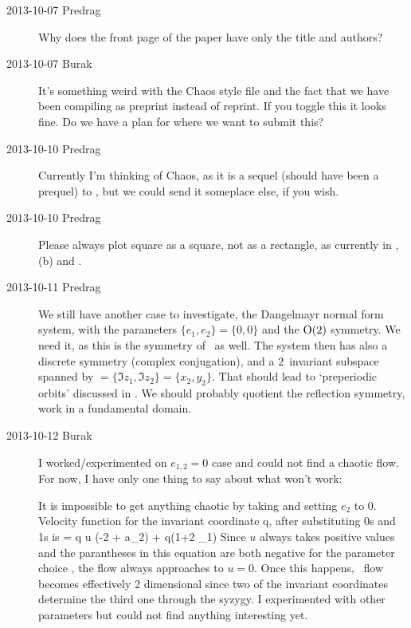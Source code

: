 \begin{description}
\item[2013-10-07 Predrag]
Why does the front page of the paper have only the title and authors?
\item[2013-10-07 Burak]
{It's something weird with the Chaos style file and the fact that
    we have been compiling as preprint instead of reprint. If you toggle
    this it looks fine. Do we have a plan for where we want to submit
    this?}
\item[2013-10-10 Predrag]
Currently I'm thinking of Chaos, as it is a sequel (should have been
a prequel) to , but we could send it someplace else,
if you wish.

\item[2013-10-10 Predrag]
Please always plot square as a square, not as a rectangle,
as currently in
, \,(b) and
.

\item[2013-10-11 Predrag]
We still have another case to investigate, the Dangelmayr
normal form system, with the parameters $\{e_1,e_2\}=\{0,0\}$
and the $\textrm{O}(2)$ symmetry. We need it, as this is the symmetry of \KS\
as well. The system  then has also a discrete symmetry
(complex conjugation), and a 2\dmn\ invariant subspace spanned by
$=\{\Im{z}_1,\Im{z}_2\}=\{x_2,y_2\}$.
That should lead to `preperiodic orbits' discussed in .
We should probably quotient the reflection symmetry, work in a
fundamental domain.

\item[2013-10-12 Burak]
I worked/experimented on $e_{1,2} = 0$ case and could not find a chaotic
flow. For now, I have only one thing to say about what won't work:

It is impossible to get anything chaotic by taking 
and setting $e_2$ to 0. Velocity function for the invariant coordinate q,
after substituting 0s and 1s \refeq{eq:1sand0s} is
\beq
	 = q u (-2 + a_2) + q(1+2 \mu_1)
	\label{vq1sand0s}
\eeq
Since $u$ always takes positive values and the parantheses in this equation
are both negative for the parameter choice \refeq{eq:parsc2red}, the flow
always approaches to $u=0$. Once this happens, \twomode\ flow becomes effectively
2 dimensional since two of the invariant coordinates determine the third one
through the syzygy. I experimented with other parameters but could not find
anything interesting yet.


\end{description}
